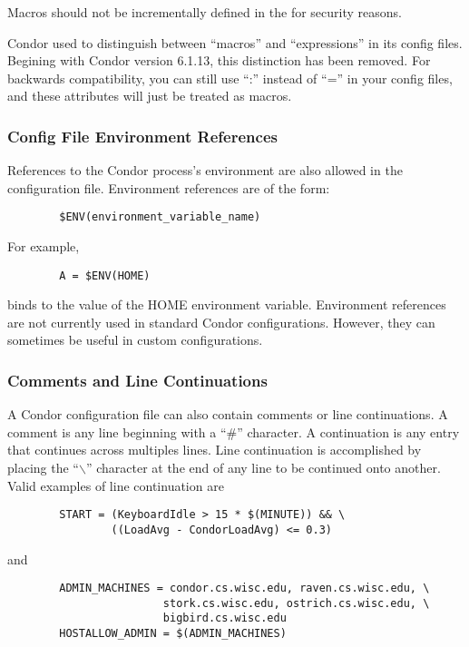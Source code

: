 \Note Macros should not be incrementally defined in the
 for security reasons.

\Note Condor used to distinguish between ``macros'' and ``expressions''
in its config files.
Begining with Condor version 6.1.13, this distinction has been
removed.
For backwards compatibility, you can still use ``:'' instead of ``=''
in your config files, and these attributes will just be treated as
macros.

\subsubsection{\label{sec:Config-File-Env}
Config File Environment References}

References to the Condor process's environment are also allowed in the
configuration file.
Environment references are of the form:
\begin{verbatim}
        $ENV(environment_variable_name)
\end{verbatim}
For example, 
\begin{verbatim}
        A = $ENV(HOME)
\end{verbatim}
binds  to the value of the HOME environment variable.
Environment references are not currently used in standard Condor
configurations.
However, they can sometimes be useful in custom configurations.

\subsubsection{\label{sec:Other-Syntax}
Comments and Line Continuations}

A Condor configuration file can also contain comments or
line continuations.
A comment is any line beginning with a ``\#'' character.
A continuation is any entry that continues across multiples lines.
Line continuation is accomplished by placing the ``$\backslash$''
character at the end of any line to be continued onto another.
Valid examples of line continuation are
\begin{verbatim}
        START = (KeyboardIdle > 15 * $(MINUTE)) && \
                ((LoadAvg - CondorLoadAvg) <= 0.3)
\end{verbatim}
and
\begin{verbatim}
        ADMIN_MACHINES = condor.cs.wisc.edu, raven.cs.wisc.edu, \
                        stork.cs.wisc.edu, ostrich.cs.wisc.edu, \
                        bigbird.cs.wisc.edu
        HOSTALLOW_ADMIN = $(ADMIN_MACHINES)
\end{verbatim}

